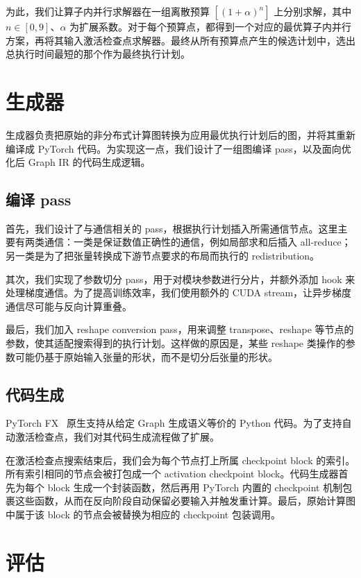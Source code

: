 \documentclass[10pt,letterpaper,twocolumn]{article}
\begin{document}
为此，我们让算子内并行求解器在一组离散预算 $[(1+\alpha)^n]$ 上分别求解，其中 $n \in [0, 9]$、$\alpha$ 为扩展系数。对于每个预算点，都得到一个对应的最优算子内并行方案，再将其输入激活检查点求解器。最终从所有预算点产生的候选计划中，选出总执行时间最短的那个作为最终执行计划。

\section{生成器}

生成器负责把原始的非分布式计算图转换为应用最优执行计划后的图，并将其重新编译成 PyTorch 代码。为实现这一点，我们设计了一组图编译 pass，以及面向优化后 Graph IR 的代码生成逻辑。

\subsection{编译 pass}

首先，我们设计了与通信相关的 pass，根据执行计划插入所需通信节点。这里主要有两类通信：一类是保证数值正确性的通信，例如局部求和后插入 all-reduce；另一类是为了把张量转换成下游节点要求的布局而执行的 redistribution。

其次，我们实现了参数切分 pass，用于对模块参数进行分片，并额外添加 hook 来处理梯度通信。为了提高训练效率，我们使用额外的 CUDA stream，让异步梯度通信尽可能与反向计算重叠。

最后，我们加入 reshape conversion pass，用来调整 transpose、reshape 等节点的参数，使其适配搜索得到的执行计划。这样做的原因是，某些 reshape 类操作的参数可能仍基于原始输入张量的形状，而不是切分后张量的形状。

\subsection{代码生成}

PyTorch FX~\cite{torch-fx} 原生支持从给定 Graph 生成语义等价的 Python 代码。为了支持自动激活检查点，我们对其代码生成流程做了扩展。

在激活检查点搜索结束后，我们会为每个节点打上所属 checkpoint block 的索引。所有索引相同的节点会被打包成一个 activation checkpoint block。代码生成器首先为每个 block 生成一个封装函数，然后再用 PyTorch 内置的 checkpoint 机制包裹这些函数，从而在反向阶段自动保留必要输入并触发重计算。最后，原始计算图中属于该 block 的节点会被替换为相应的 checkpoint 包装调用。

\section{评估}
\end{document}
